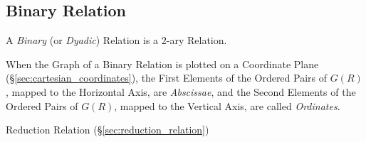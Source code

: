 \subsection{Binary Relation}\label{sec:binary_relation}

A \emph{Binary} (or \emph{Dyadic}) Relation is a $2$-ary Relation.

When the Graph of a Binary Relation is plotted on a Coordinate Plane
(\S\ref{sec:cartesian_coordinates}), the First Elements of the Ordered
Pairs of $G(R)$, mapped to the Horizontal Axis, are \emph{Abscissae},
and the Second Elements of the Ordered Pairs of $G(R)$, mapped to the
Vertical Axis, are called \emph{Ordinates}.

Reduction Relation (\S\ref{sec:reduction_relation})

